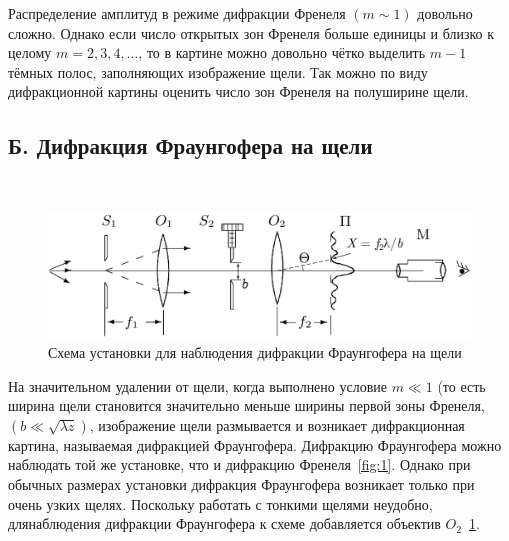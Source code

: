 \documentclass[12pt]{article}
\begin{document}
    Распределение амплитуд в режиме дифракции Френеля $(m \sim 1)$ довольно сложно.
    Однако если число открытых зон Френеля больше единицы и близко к целому $m = 2, 3, 4, \dots$,
    то в картине можно довольно чётко выделить $m - 1$ тёмных полос, заполняющих изображение щели.
    Так можно по виду дифракционной картины оценить число зон Френеля на полуширине щели.

    \subsection*{Б. Дифракция Фраунгофера на щели}
    \ \par
    \begin{figure}[h]
        \centering
        \includegraphics[width=\linewidth]{pic/setupB}
        \caption{Схема установки для наблюдения дифракции Фраунгофера на щели}
        \label{fig:2}
    \end{figure}
    На значительном удалении от щели, когда выполнено условие $m \ll 1$ (то есть ширина
    щели становится значительно меньше ширины первой зоны Френеля, $(b\ll\sqrt{\lambda z})$,
    изображение щели размывается и возникает дифракционная картина, называемая дифракцией Фраунгофера.
    Дифракцию Фраунгофера можно наблюдать той же установке, что и дифракцию Френеля\ \figurename{\ref{fig:1}}.
    Однако при обычных размерах установки дифракция Фраунгофера возникает только при очень узких щелях.
    Поскольку работать с тонкими щелями неудобно, длянаблюдения дифракции Фраунгофера к схеме добавляется объектив $O_2$\ \figurename{\ref{fig:2}}.
\end{document}
